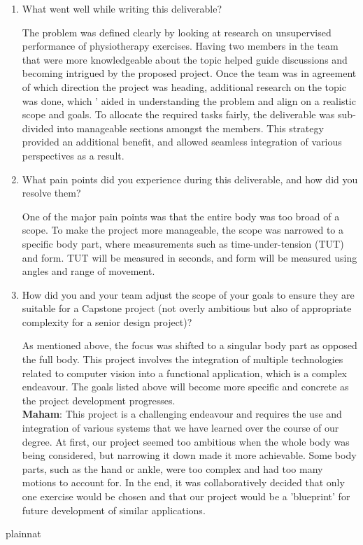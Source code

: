 \documentclass{article}
\begin{document}


\begin{enumerate}
    \item What went well while writing this deliverable? 

    The problem was defined clearly by looking at research on unsupervised performance of physiotherapy exercises. Having two members in the team that were more knowledgeable 
    about the topic helped guide discussions and becoming intrigued by the proposed project. Once the team was in agreement of which direction the project was heading, additional research on the topic was done, which ' aided in understanding the problem and align 
    on a realistic scope and goals. 
    To allocate the required tasks fairly, the deliverable was sub-divided into manageable sections amongst the members. This strategy provided an additional benefit, and allowed seamless integration of various perspectives as a result. 

    \item What pain points did you experience during this deliverable, and how
    did you resolve them?

    One of the major pain points was that the entire body was too broad of a scope. To make the project more manageable, the scope was narrowed to a specific body part, where measurements such as time-under-tension (TUT) and form. TUT will be measured in seconds, and form will be measured using angles and range of movement.

    \item How did you and your team adjust the scope of your goals to ensure
    they are suitable for a Capstone project (not overly ambitious but also of
    appropriate complexity for a senior design project)?
    
    As mentioned above, the focus was shifted to a singular body part as opposed the full body. This project involves the integration 
    of multiple technologies related to computer vision into a functional application, which is a complex endeavour. 
   The goals listed above will become more specific and concrete as the project development progresses. \\
   
   \textbf{Maham}: This project is a challenging endeavour and requires the use and integration of various systems that we have learned over the course of our degree. At first, our project seemed too ambitious when the whole body was being considered, but narrowing it down
   made it more achievable. Some body parts, such as the hand or ankle, were too complex and had too many motions to account for. In the end, it was collaboratively decided that only one exercise would be chosen and that our project would be a 'blueprint' for future development of similar applications. 
   
\end{enumerate}  

 {plainnat}

\end{document}
